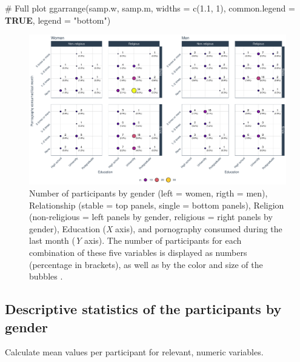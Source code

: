 \documentclass[
  bookmarksnumbered]{article}
\newenvironment{Shaded}{\begin{snugshade}}{\end{snugshade}}
\newcommand{\AttributeTok}[1]{\textcolor[rgb]{0.80,0.80,0.80}{#1}}
\newcommand{\CommentTok}[1]{\textcolor[rgb]{0.50,0.62,0.50}{#1}}
\newcommand{\ConstantTok}[1]{\textcolor[rgb]{0.86,0.64,0.64}{\textbf{#1}}}
\newcommand{\DecValTok}[1]{\textcolor[rgb]{0.86,0.86,0.80}{#1}}
\newcommand{\FloatTok}[1]{\textcolor[rgb]{0.75,0.75,0.82}{#1}}
\newcommand{\FunctionTok}[1]{\textcolor[rgb]{0.94,0.94,0.56}{#1}}
\newcommand{\NormalTok}[1]{\textcolor[rgb]{0.80,0.80,0.80}{#1}}
\newcommand{\StringTok}[1]{\textcolor[rgb]{0.80,0.58,0.58}{#1}}
\begin{document}
\begin{Shaded}
\begin{Highlighting}[]
\CommentTok{\# Full plot}
\FunctionTok{ggarrange}\NormalTok{(samp.w, samp.m,}
          \AttributeTok{widths =} \FunctionTok{c}\NormalTok{(}\FloatTok{1.1}\NormalTok{, }\DecValTok{1}\NormalTok{), }
          \AttributeTok{common.legend =} \ConstantTok{TRUE}\NormalTok{,}
          \AttributeTok{legend =} \StringTok{"bottom"}\NormalTok{)}
\end{Highlighting}
\end{Shaded}

\begin{figure}
\centering
\includegraphics{Sexual_Desire_Arousal_V2_files/figure-latex/sample-plot-1.pdf}
\caption{\label{fig:sample-plot}Number of participants by gender (left = women, rigth = men), Relationship (stable = top panels, single = bottom panels), Religion (non-religious = left panels by gender, religious = right panels by gender), Education (\emph{X} axis), and pornography consumed during the last month (\emph{Y} axis). The number of participants for each combination of these five variables is displayed as numbers (percentage in brackets), as well as by the color and size of the bubbles .}
\end{figure}

\subsection{Descriptive statistics of the participants by gender}\label{descriptive-statistics-of-the-participants-by-gender}

Calculate mean values per participant for relevant, numeric variables.
\end{document}
